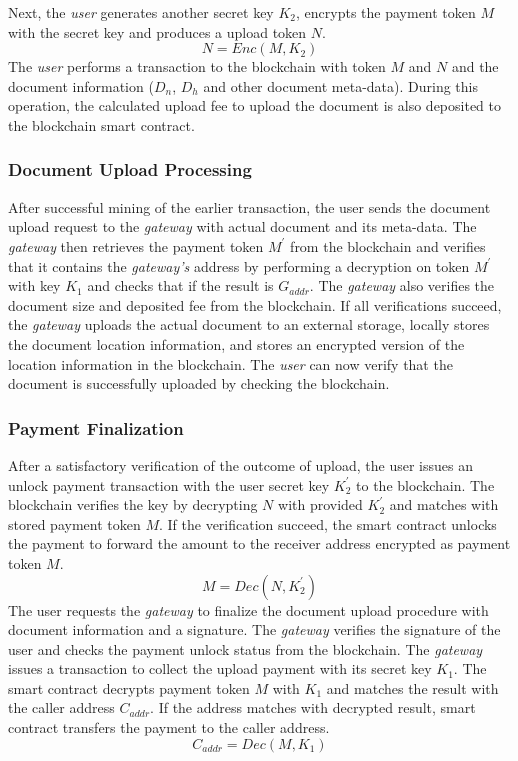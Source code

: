 Next, the {\it user} generates another secret key $K_2$, encrypts the payment token $M$ with the secret key and produces a upload token $N$.
\begin{equation}
\label{eq-u-3}
N = Enc (M, K_2)
\end{equation}
The {\it user} performs a transaction to the blockchain with token $M$ and $N$ and the document information ($D_{n}$, $D_{h}$ and other document meta-data). During this operation, the calculated upload fee to upload the document is also deposited to the blockchain smart contract.
 
\subsubsection{Document Upload Processing}
After successful mining of the earlier transaction, the user sends the document upload request to the {\it gateway} with actual document and its meta-data. The {\it gateway} then retrieves the payment token $M^\prime$ from the blockchain and verifies that it contains the {\it gateway's} address by performing a decryption on token $M^\prime$ with key $K_1$ and checks that if the result is $G_{addr}$. The {\it gateway} also verifies the document size and deposited fee from the blockchain. If all verifications succeed, the {\it gateway} uploads the actual document to an external storage, locally stores the document location information, and stores an encrypted version of the location information in the blockchain. The {\it user} can now verify that the document is successfully uploaded by checking the blockchain. 

\subsubsection{Payment Finalization}
After a satisfactory verification of the outcome of upload, the user issues an unlock payment transaction with the user secret key $K_2^\prime$ to the blockchain. The blockchain verifies the key by decrypting $N$ with provided $K_2^\prime$ and matches with stored payment token $M$. If the verification succeed, the smart contract unlocks the payment to forward the amount to the receiver address encrypted as payment token $M$.
\begin{equation}
\label{eq-u-5}
M = Dec (N, K_2^\prime)
\end{equation}
The user requests the {\it gateway} to finalize the document upload procedure with document information and a signature. The {\it gateway} verifies the signature of the user and checks the payment unlock status from the blockchain. The {\it gateway} issues a transaction to collect the upload payment with its secret key $K_1$. The smart contract decrypts payment token $M$ with $K_1$ and matches the result with the caller address $C_{addr}$. If the address matches with decrypted result, smart contract transfers the payment to the caller  address.
\begin{equation}
\label{eq-u-6}
C_{addr} = Dec (M, K_1)
\end{equation}

